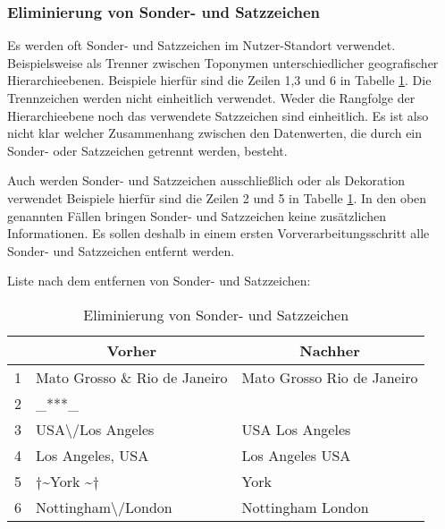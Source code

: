 			\subsubsection{Eliminierung von Sonder- und Satzzeichen} 

				Es werden oft Sonder- und Satzzeichen im Nutzer-Standort verwendet. 
				Beispielsweise als Trenner zwischen Toponymen unterschiedlicher geografischer Hierarchieebenen.
				Beispiele hierfür sind die Zeilen 1,3 und 6 in Tabelle \ref{tab:VorverarbeitungSonder}. 
				Die Trennzeichen werden nicht einheitlich verwendet.
				Weder die Rangfolge der Hierarchieebene noch das verwendete Satzzeichen sind einheitlich.  
				Es ist also nicht klar welcher Zusammenhang zwischen den Datenwerten, die durch ein Sonder- oder Satzzeichen getrennt werden, besteht. 

				Auch werden Sonder- und Satzzeichen ausschließlich oder als Dekoration verwendet Beispiele hierfür sind die Zeilen 2 und 5 in Tabelle \ref{tab:VorverarbeitungSonder}.
				In den oben genannten Fällen bringen Sonder- und Satzzeichen keine zusätzlichen Informationen.
				Es sollen deshalb in einem ersten Vorverarbeitungsschritt alle Sonder- und Satzzeichen entfernt werden. 

				Liste nach dem entfernen von Sonder- und Satzzeichen:

				\begin{table}[h]
				\centering
				\caption{Eliminierung von Sonder- und Satzzeichen}
				\label{tab:VorverarbeitungSonder}
				\begin{tabular}{|l|l|l|}
				\hline \hline
				  & \multicolumn{1}{c|}{\textbf{Vorher}} & \multicolumn{1}{c|}{\textbf{Nachher}} \\ \hline
				1 & Mato Grosso \& Rio de Janeiro        & Mato Grosso Rio de Janeiro            \\ \hline
				2 & \_***\_                              &                                       \\ \hline
				3 & USA\textbackslash /Los Angeles       & USA Los Angeles                       \\ \hline
				4 & Los Angeles, USA                     & Los Angeles USA                       \\ \hline
				5 & $\dagger$\textasciitilde York \textasciitilde$\dagger$                             & York                                  \\ \hline
				6 & Nottingham\textbackslash /London     & Nottingham London                     \\ \hline
				\end{tabular}
				\end{table}


